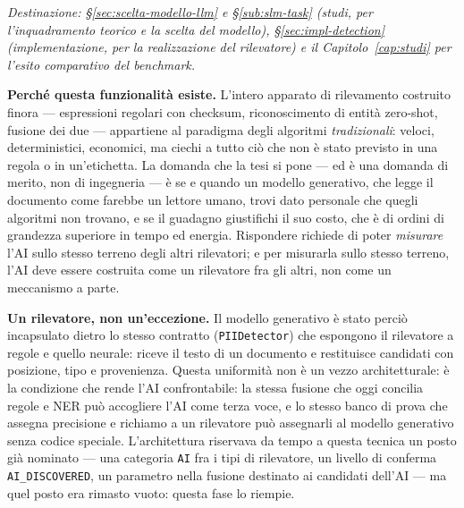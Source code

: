 \textit{Destinazione: §\ref{sec:scelta-modello-llm} e §\ref{sub:slm-task} (studi, per l'inquadramento teorico e la scelta del modello), §\ref{sec:impl-detection} (implementazione, per la realizzazione del rilevatore) e il Capitolo~\ref{cap:studi} per l'esito comparativo del benchmark.} \medskip

\textbf{Perché questa funzionalità esiste.} L'intero apparato di rilevamento costruito finora --- espressioni regolari con checksum, riconoscimento di entità zero-shot, fusione dei due --- appartiene al paradigma degli algoritmi \emph{tradizionali}: veloci, deterministici, economici, ma ciechi a tutto ciò che non è stato previsto in una regola o in un'etichetta. La domanda che la tesi si pone --- ed è una domanda di merito, non di ingegneria --- è se e quando un modello generativo, che legge il documento come farebbe un lettore umano, trovi dato personale che quegli algoritmi non trovano, e se il guadagno giustifichi il suo costo, che è di ordini di grandezza superiore in tempo ed energia. Rispondere richiede di poter \emph{misurare} l'AI sullo stesso terreno degli altri rilevatori; e per misurarla sullo stesso terreno, l'AI deve essere costruita come un rilevatore fra gli altri, non come un meccanismo a parte. \medskip

\textbf{Un rilevatore, non un'eccezione.} Il modello generativo è stato perciò incapsulato dietro lo stesso contratto (\texttt{PIIDetector}) che espongono il rilevatore a regole e quello neurale: riceve il testo di un documento e restituisce candidati con posizione, tipo e provenienza. Questa uniformità non è un vezzo architetturale: è la condizione che rende l'AI confrontabile: la stessa fusione che oggi concilia regole e NER può accogliere l'AI come terza voce, e lo stesso banco di prova che assegna precisione e richiamo a un rilevatore può assegnarli al modello generativo senza codice speciale. L'architettura riservava da tempo a questa tecnica un posto già nominato --- una categoria \texttt{AI} fra i tipi di rilevatore, un livello di conferma \texttt{AI\_DISCOVERED}, un parametro nella fusione destinato ai candidati dell'AI --- ma quel posto era rimasto vuoto: questa fase lo riempie. \medskip

